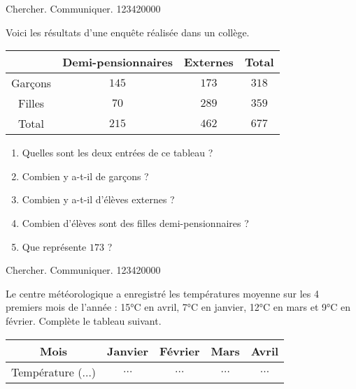 \begin{pageAD} 


\begin{ExoCad}{Chercher. Communiquer. }{1234}{2}{0}{0}{0}{0}

Voici les résultats d'une enquête réalisée dans un collège.

 \begin{center}
 \begin{tabular}{|c|c|c|c|}\hline 
  & Demi-pensionnaires & Externes & Total \\\hline 
  Garçons & $145$ & $173$ & $318$ \\\hline
  Filles & $70$ & $289$ & $359$ \\\hline
  Total & $215$ & $462$ & $677$ \\\hline 
 \end{tabular}
 \end{center}
 
 \begin{enumerate}[leftmargin=*]
 \item Quelles sont les deux entrées de ce tableau ? 
 \item Combien y a-t-il de garçons ? 
 \item Combien y a-t-il d'élèves externes ? 
 \item Combien d'élèves sont des filles demi-pensionnaires ?  
 \item Que représente $173$ ?  
\end{enumerate}
\end{ExoCad}


\begin{ExoCad}{Chercher. Communiquer. }{1234}{2}{0}{0}{0}{0}

Le centre météorologique a enregistré les températures moyenne sur les 4 premiers mois de l'année : 15°C en avril, 7°C en janvier, 12°C en mars et 9°C en février. Complète le tableau suivant.

 \begin{center}
 \begin{tabular}{|c|c|c|c|c|}\hline 
  Mois & Janvier & Février & Mars & Avril \\\hline 
  Température ($\ldots$)& $\ldots$ & $\ldots$ & $\ldots$ & $\ldots$ \\\hline
 \end{tabular}
 \end{center}
\end{ExoCad}


\end{pageAD}
